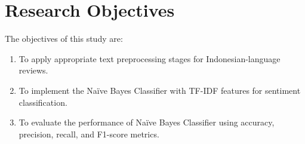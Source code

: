 \section{Research Objectives}

The objectives of this study are:

\begin{enumerate}
  \item To apply appropriate text preprocessing stages for Indonesian-language reviews.
  \item To implement the Na\"ive Bayes Classifier with TF-IDF features for sentiment classification.
  \item To evaluate the performance of Na\"ive Bayes Classifier using accuracy, precision, recall, and F1-score metrics.
\end{enumerate}
